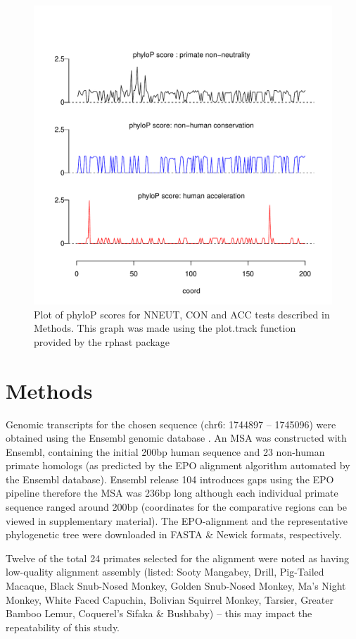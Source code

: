 \documentclass{article}[12pt]
\begin{document}
\begin{figure}[H]
\centering
\includegraphics[width=12cm]{compare_phyloP.pdf}
\caption{Plot of phyloP scores for NNEUT, CON and ACC tests described in Methods. This graph was made using the plot.track function provided by the rphast package \parencite{Rphast}}
\label{fig2}
\end{figure}


\section{Methods}

Genomic transcripts for the chosen sequence (chr6: 1744897 – 1745096) were obtained using the Ensembl genomic database \parencite{Ensembl}. An \Gls{MSA} was constructed with Ensembl, containing the initial 200bp human sequence and 23 non-human primate homologs (as predicted by the \Gls{EPO} alignment algorithm automated by the Ensembl database). Ensembl release 104 introduces gaps using the EPO pipeline therefore the MSA was 236bp long although each individual primate sequence ranged around 200bp (coordinates for the comparative regions can be viewed in supplementary material). The EPO-alignment and the representative phylogenetic tree were downloaded in FASTA \& Newick formats, respectively.

Twelve of the total 24 primates selected for the alignment were noted as having low-quality alignment assembly (listed: Sooty Mangabey, Drill, Pig-Tailed Macaque, Black Snub-Nosed Monkey, Golden Snub-Nosed Monkey, Ma’s Night Monkey, White Faced Capuchin, Bolivian Squirrel Monkey, Tarsier, Greater Bamboo Lemur, Coquerel’s Sifaka \& Bushbaby) – this may impact the repeatability of this study.
\end{document}
